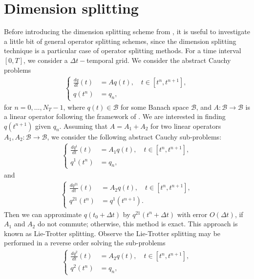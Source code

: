 \section{Dimension splitting}
\label{sec-dsplit}
Before introducing the dimension splitting scheme from \citet{lin:1996}, it is useful to 
investigate a little bit of general operator splitting schemes, since the dimension splitting technique
is a particular case of operator splitting methods.
For a time interval $[0,T]$, we consider a $\Delta t-$temporal grid.
We consider the abstract Cauchy problems
\begin{align*}
	\begin{cases}
		\frac{dq}{dt}(t) &= Aq(t), \quad t \in [t^n,t^{n+1}],\\
		q(t^n) &= q_n,
	\end{cases}
\end{align*}
for $n=0,\ldots, N_T-1$, where $q(t) \in \mathcal{B}$ for some Banach space $\mathcal{B}$, and $A:\mathcal{B} \to \mathcal{B}$ is a linear operator
following the framework of \citet[Chapter~3]{richtmyer:1968}.
We are interested in finding $q(t^{n+1})$ given $q_n$.
Assuming that $A = A_1 + A_2$ for two linear operators $A_1, A_2:\mathcal{B} \to \mathcal{B}$, we consider the following abstract Cauchy sub-problems:
\begin{align*}
	\begin{cases}
		\frac{dq^1}{dt}(t) &= A_1q(t), \quad t \in [t^{n},t^{n+1}],\\
		q^{1}(t^n) &= q_n,
	\end{cases}
\end{align*}
and
\begin{align*}
	\begin{cases}
		\frac{dq^{21}}{dt}(t) &= A_2q(t), \quad t \in [t^n,t^{n+1}],\\
		q^{21}(t^n) &= q^1(t^{n+1}).
	\end{cases}
\end{align*}
Then we can approximate $q(t_0 + \Delta t)$ by $q^{21}(t^n + \Delta t)$ with error $O(\Delta t)$, if $A_1$ and $A_2$
do not commute; otherwise, this method is exact.
This approach is known as Lie-Trotter splitting. Observe the  Lie-Trotter splitting may be performed
in a reverse order solving the sub-problems
\begin{align*}
	\begin{cases}
		\frac{dq^2}{dt}(t) &= A_2q(t), \quad t \in [t^n,t^{n+1}],\\
		q^{2}(t^n) &= q_n,
	\end{cases}
\end{align*}
